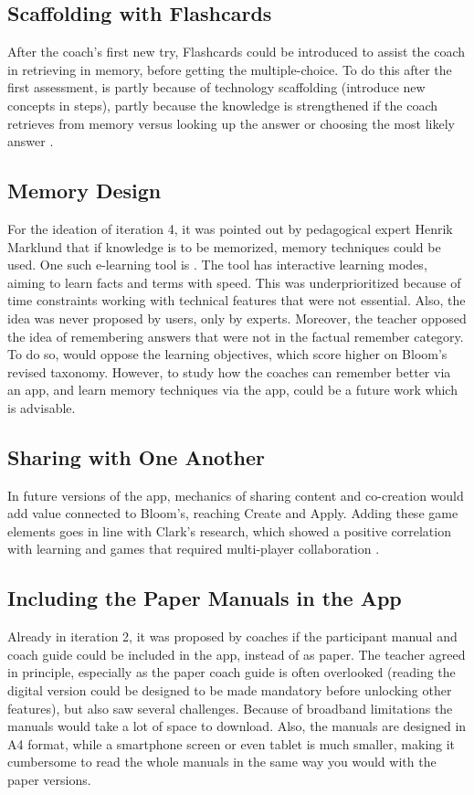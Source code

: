 \subsection{Scaffolding with Flashcards}
After the coach's first new try, Flashcards could be introduced to assist the coach in retrieving in memory, before getting the multiple-choice. To do this after the first assessment, is partly because of technology scaffolding (introduce new concepts in steps), partly because the knowledge is strengthened if the coach retrieves from memory versus looking up the answer or choosing the most likely answer \citep{bjork}.

\subsection{Memory Design}
For the ideation of iteration 4, it was pointed out by pedagogical expert Henrik Marklund that if knowledge is to be memorized, memory techniques could be used. One such e-learning tool is \cite{memorize}. The tool has interactive learning modes, aiming to learn facts and terms with speed. This was underprioritized because of time constraints working with technical features that were not essential. Also, the idea was never proposed by users, only by experts. Moreover, the teacher opposed the idea of remembering answers that were not in the factual remember category. To do so, would oppose the learning objectives, which score higher on Bloom's revised taxonomy. However, to study how the coaches can remember better via an app, and learn memory techniques via the app, could be a future work which is advisable.

\subsection{Sharing with One Another}

In future versions of the app, mechanics of sharing content and co-creation would add value connected to Bloom's, reaching Create and Apply. Adding these game elements goes in line with Clark's research, which showed a positive correlation with learning and games that required multi-player collaboration \citep{gates}.


\subsection{Including the Paper Manuals in the App}

Already in iteration 2, it was proposed by coaches if the participant manual and coach guide could be included in the app, instead of as paper. The teacher agreed in principle, especially as the paper coach guide is often overlooked (reading the digital version could be designed to be made mandatory before unlocking other features), but also saw several challenges.  Because of broadband limitations the manuals would take a lot of space to download. Also, the manuals are designed in A4 format, while a smartphone screen or even tablet is much smaller, making it cumbersome to read the whole manuals in the same way you would with the paper versions.


